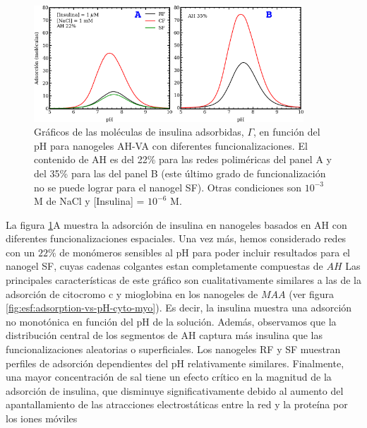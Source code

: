 \begin{figure}[!htb]
    \centering
    \includegraphics[width=0.9\textwidth]{Figures/graphs-gel2/insu-PAH.pdf}
    \caption{Gr\'aficos de las mol\'eculas de insulina adsorbidas, $\Gamma$, en funci\'on del pH para nanogeles AH-VA con diferentes funcionalizaciones.
    	El contenido de AH es del 22\% para las redes polim\'ericas del panel A y del 35\% para las del panel B (este \'ultimo grado de funcionalización no se puede lograr para el nanogel SF).
    	Otras condiciones son $10^{-3}$ M de NaCl y [Insulina] = $10^{-6}$ M.}
    \label{fig:esf:adsorption-vs-pH-insulin}
\end{figure}




La figura \ref{fig:esf:adsorption-vs-pH-insulin}A muestra la adsorci\'on de insulina en nanogeles basados en AH con diferentes funcionalizaciones espaciales.
Una vez m\'as, hemos considerado redes con un $22\%$ de mon\'omeros sensibles al pH para poder incluir resultados para el nanogel SF, cuyas cadenas colgantes estan completamente compuestas  de $AH$
Las principales caracter\'isticas de este gr\'afico son cualitativamente similares a las de la adsorci\'on de citocromo c y mioglobina en los nanogeles de $MAA$ (ver figura \ref{fig:esf:adsorption-vs-pH-cyto-myo}).
Es decir, la insulina muestra una adsorci\'on no monot\'onica en funci\'on del pH de la soluci\'on.
Adem\'as, observamos que la distribuci\'on central de los segmentos de AH captura m\'as insulina que las funcionalizaciones aleatorias o superficiales.
Los nanogeles RF y SF muestran perfiles de adsorci\'on dependientes del pH relativamente similares.
Finalmente, una mayor concentraci\'on de sal tiene un efecto cr\'itico en la magnitud de la adsorci\'on de insulina, que disminuye significativamente debido al aumento del apantallamiento de las atracciones electrost\'aticas entre la red y la prote\'ina por los iones m\'oviles

